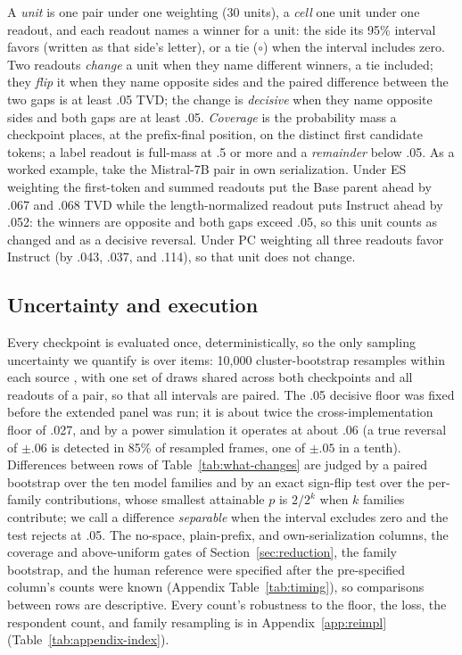 \documentclass[11pt]{article}
\newcommand{\ES}{\textsc{ES}}
\newcommand{\PC}{\textsc{PC}}
\begin{document}
A \emph{unit} is one pair under one weighting (30 units), a \emph{cell} one unit under one readout, and each readout names a winner for a unit: the side its 95\% interval favors (written as that side's letter), or a tie ($\circ$) when the interval includes zero. Two readouts \emph{change} a unit when they name different winners, a tie included; they \emph{flip} it when they name opposite sides and the paired difference between the two gaps is at least .05 TVD; the change is \emph{decisive} when they name opposite sides and both gaps are at least .05. \emph{Coverage} is the probability mass a checkpoint places, at the prefix-final position, on the distinct first candidate tokens; a label readout is full-mass at .5 or more and a \emph{remainder} below .05. As a worked example, take the Mistral-7B pair in own serialization. Under \ES{} weighting the first-token and summed readouts put the Base parent ahead by .067 and .068 TVD while the length-normalized readout puts Instruct ahead by .052: the winners are opposite and both gaps exceed .05, so this unit counts as changed and as a decisive reversal. Under \PC{} weighting all three readouts favor Instruct (by .043, .037, and .114), so that unit does not change.

\subsection{Uncertainty and execution}
\label{sec:execution}

Every checkpoint is evaluated once, deterministically, so the only sampling
uncertainty we quantify is over items: 10,000 cluster-bootstrap resamples within each source \citep{field2007bootstrapping,miller2024adding}, with one set of draws shared
across both checkpoints and all readouts of a pair, so that all intervals are
paired. The .05 decisive floor was fixed before the extended panel was run; it is about twice the cross-implementation floor of .027, and by a power simulation it operates at about .06 (a true reversal of $\pm.06$ is detected in 85\% of resampled frames, one of $\pm.05$ in a tenth). Differences between rows of Table~\ref{tab:what-changes} are judged by a paired bootstrap over the ten model families and by an exact sign-flip test over the per-family contributions, whose smallest attainable $p$ is $2/2^k$ when $k$ families contribute; we call a difference \emph{separable} when the interval excludes zero and the test rejects at .05. The no-space, plain-prefix, and own-serialization columns, the coverage and above-uniform gates of Section~\ref{sec:reduction}, the family bootstrap, and the human reference were specified after the pre-specified column's counts were known (Appendix Table~\ref{tab:timing}), so comparisons between rows are descriptive. Every count's robustness to the floor, the loss, the respondent count, and family resampling is in Appendix~\ref{app:reimpl} (Table~\ref{tab:appendix-index}).
\end{document}
